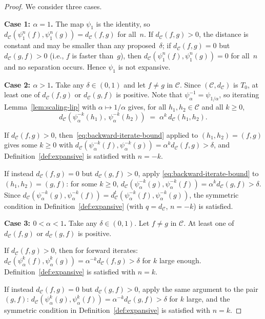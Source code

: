\documentclass[11pt,a4paper]{article}
\theoremstyle{plain}
\theoremstyle{definition}
\newcommand{\C}{\mathcal{C}}
\begin{document}
\begin{proof}
We consider three cases.

\textbf{Case 1: $\alpha=1$.}  The map $\psi_1$ is the identity, so
$d_\C(\psi_1^n(f),\psi_1^n(g))=d_\C(f,g)$ for all~$n$.  If
$d_\C(f,g)>0$, the distance is constant and may be smaller than any
proposed~$\delta$; if $d_\C(f,g)=0$ but $d_\C(g,f)>0$ (i.e., $f$ is
faster than~$g$), then $d_\C(\psi_1^n(f),\psi_1^n(g))=0$ for all~$n$
and no separation occurs.  Hence $\psi_1$ is not expansive.

\textbf{Case 2: $\alpha>1$.}  Take any $\delta\in(0,1)$ and let
$f\ne g$ in $\C$.  Since $(\C,d_\C)$ is $T_0$, at least one of
$d_\C(f,g)$ or $d_\C(g,f)$ is positive.  Note that
$\psi_\alpha^{-1}=\psi_{1/\alpha}$, so iterating
Lemma~\ref{lem:scaling-lip} with $\alpha\mapsto 1/\alpha$ gives,
for all $h_1,h_2\in\C$ and all $k\ge 0$,
\begin{equation}\label{eq:backward-iterate-bound}
  d_\C\!\left(\psi_\alpha^{-k}(h_1),\,\psi_\alpha^{-k}(h_2)\right)
  \;=\; \alpha^{k}\,d_\C(h_1,h_2).
\end{equation}

If $d_\C(f,g)>0$, then~\eqref{eq:backward-iterate-bound} applied to
$(h_1,h_2)=(f,g)$ gives some $k\ge 0$ with
$d_\C(\psi_\alpha^{-k}(f),\psi_\alpha^{-k}(g))=\alpha^k d_\C(f,g)>\delta$,
and Definition~\ref{def:expansive} is satisfied with $n=-k$.

If instead $d_\C(f,g)=0$ but $d_\C(g,f)>0$, apply
\eqref{eq:backward-iterate-bound} to $(h_1,h_2)=(g,f)$: for some
$k\ge 0$,
$d_\C(\psi_\alpha^{-k}(g),\psi_\alpha^{-k}(f))=\alpha^k d_\C(g,f)>\delta$.
Since $d_\C(\psi_\alpha^{-k}(g),\psi_\alpha^{-k}(f))
=d_\C^t(\psi_\alpha^{-k}(f),\psi_\alpha^{-k}(g))$, the symmetric
condition in Definition~\ref{def:expansive} (with $q=d_\C$, $n=-k$)
is satisfied.

\textbf{Case 3: $0<\alpha<1$.}  Take any $\delta\in(0,1)$.  Let
$f\ne g$ in $\C$.  At least one of $d_\C(f,g)$ or $d_\C(g,f)$ is
positive.

If $d_\C(f,g)>0$, then for forward iterates:
$d_\C(\psi_\alpha^k(f),\psi_\alpha^k(g))=\alpha^{-k}d_\C(f,g)>\delta$
for $k$ large enough.  Definition~\ref{def:expansive} is satisfied
with $n=k$.

If instead $d_\C(f,g)=0$ but $d_\C(g,f)>0$, apply the same argument
to the pair $(g,f)$: $d_\C(\psi_\alpha^k(g),\psi_\alpha^k(f))
=\alpha^{-k}d_\C(g,f)>\delta$ for $k$ large, and the symmetric
condition in Definition~\ref{def:expansive} is satisfied with
$n=k$.
\end{proof}
\end{document}

